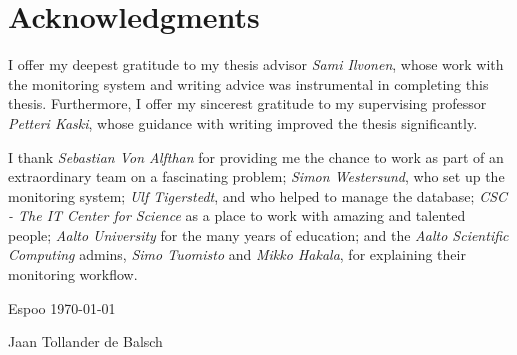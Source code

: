\section*{Acknowledgments}
I offer my deepest gratitude to my thesis advisor \emph{Sami Ilvonen}, whose work with the monitoring system and writing advice was instrumental in completing this thesis.
Furthermore, I offer my sincerest gratitude to my supervising professor \emph{Petteri Kaski}, whose guidance with writing improved the thesis significantly.

I thank \emph{Sebastian Von Alfthan} for providing me the chance to work as part of an extraordinary team on a fascinating problem; \emph{Simon Westersund}, who set up the monitoring system; \emph{Ulf Tigerstedt}, and who helped to manage the database;
\emph{CSC - The IT Center for Science} as a place to work with amazing and talented people; \emph{Aalto University} for the many years of education; and the \emph{Aalto Scientific Computing} admins, \emph{Simo Tuomisto} and \emph{Mikko Hakala}, for explaining their monitoring workflow.

\vspace{5cm}
Espoo \today

\vspace{5mm}
{\hfill Jaan Tollander de Balsch \hspace{1cm}}

\newpage

\setcounter{tocdepth}{2}
\tableofcontents
